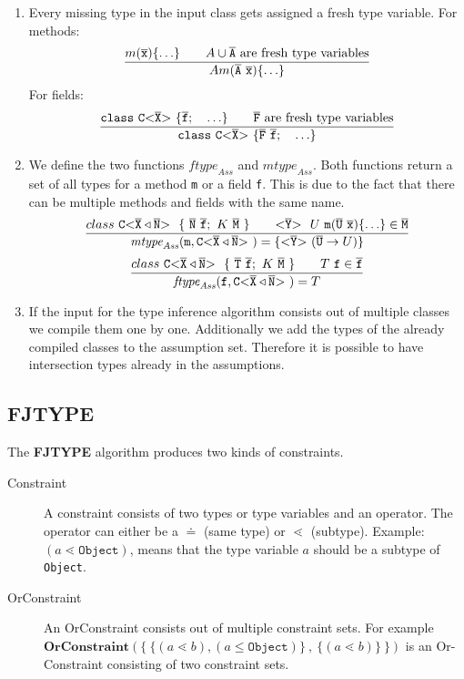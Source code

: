 \documentclass[runningheads]{llncs}
\begin{document}
\begin{enumerate}
\item Every missing type in the input class gets assigned a fresh type variable.
For methods:
\begin{align*}
  \frac{\displaystyle 
  m(\overline{\tt x}) \{ \ldots \} \quad \quad A \cup \overline{\tt A} \ \text{are fresh type variables}
  }{\displaystyle 
  A m(\overline{\tt A}\ \overline{\tt x}) \{ \ldots \}
  }
  \end{align*}
  For fields:
\begin{align*}
  \frac{\displaystyle 
  \texttt{class}\ \mathtt{C {\tt <} \overline{\tt X} {\tt >} \ } \{ \overline{\tt f}; \quad \ldots \} \quad \quad \overline{\tt F} \ \text{are fresh type variables}
  }{\displaystyle 
    \texttt{class}\ \mathtt{C {\tt <} \overline{\tt X} {\tt >} \ } \{ \overline{\tt F} \ \overline{\tt f}; \quad \ldots \}
  }
\end{align*}
\item We define the two functions $\textit{ftype}_\textit{Ass}$ and $\textit{mtype}_\textit{Ass}$.
Both functions return a set of all types for a method \texttt{m} or a field \texttt{f}.
This is due to the fact that there can be multiple methods and fields with the same name.
\begin{align*}
  \frac{\displaystyle 
    class\ \mathtt{C {\tt <} \overline{\tt X} \triangleleft \overline{\tt N} {\tt >} \ }\ \{\ \overline{\tt N}\ \overline{\tt f};\ K\ \overline{\tt M}\ \} \quad \quad
    \mathtt{ {\tt <} \overline{\tt Y} {\tt >} \ }\ U\ \texttt{m}(\overline{\tt U}\ \overline{\tt x}) \{ \ldots \} \in \overline{\tt M}
  }{\displaystyle 
    \textit{mtype}_\textit{Ass}(\texttt{m}, \mathtt{C {\tt <} \overline{\tt X} \triangleleft \overline{\tt N} {\tt >} \ }) =  \{ \mathtt{ {\tt <} \overline{\tt Y} {\tt >} \ } (\overline{\tt U} \to U ) \}
  }
\end{align*}
\begin{align*}
  \frac{\displaystyle 
    class\ \mathtt{C {\tt <} \overline{\tt X} \triangleleft \overline{\tt N} {\tt >} \ }\ \{\ \overline{\tt T}\ \overline{\tt f};\ K\ \overline{\tt M}\ \} \quad \quad
    T\ \texttt{f} \in \overline{\tt f}
  }{\displaystyle 
    \textit{ftype}_\textit{Ass}(\texttt{f}, \mathtt{C {\tt <} \overline{\tt X} \triangleleft \overline{\tt N} {\tt >} \ }) = T
  }
\end{align*}
\item If the input for the type inference algorithm consists out of multiple classes we compile them one by one.
Additionally we add the types of the already compiled classes to the assumption set.
Therefore it is possible to have intersection types already in the assumptions.
\end{enumerate}


\subsection{FJTYPE}
The \textbf{FJTYPE} algorithm produces two kinds of constraints.
\begin{description}
\item[Constraint] A constraint consists of two types or type variables and an operator.
The operator can either be a $\doteq$ (same type) or $\lessdot$ (subtype).
Example: $(a \lessdot \mathtt{Object})$, means that the type variable $a$ should be a subtype of \texttt{Object}.
\item[OrConstraint] An OrConstraint consists out of multiple constraint sets.
For example $\textbf{OrConstraint}(\{ \ \{ (a \lessdot b), (a \leq \mathtt{Object}) \} \ , \ \{ (a \lessdot b)\} \ \})$
is an Or-Constraint consisting of two constraint sets.
\end{description}
\end{document}
